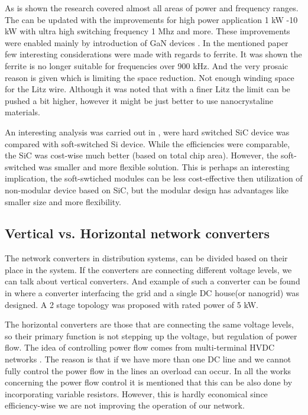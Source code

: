 \documentclass[]{scrartcl}
\begin{document}
As is shown the research covered almost all areas of power and frequency ranges. The \cite{Shen2006} can be updated with the improvements for high power application 1 kW -10 kW with ultra high switching frequency 1 Mhz and more. These improvements were enabled mainly by introduction of GaN devices \cite{Mu2014}. In the mentioned paper \cite{Mu2014} few interesting considerations were made  with regards to ferrite. It was shown the ferrite is no longer suitable for  frequencies over 900 kHz. And the very prosaic reason is given which is limiting the space reduction. Not enough winding space for  the Litz wire. Although it was noted that with a finer Litz the limit can be pushed a bit higher, however it might be just better to use nanocrystaline materials. 


An interesting analysis was carried out in \cite{Waffler2009}, were hard switched SiC device was compared with soft-switched Si device. While the efficiencies were comparable, the SiC was cost-wise much better (based on total chip area). However, the soft-switched was smaller and more flexible solution. This is perhaps an interesting implication, the soft-swtiched modules can be less cost-effective then utilization of non-modular device based on SiC, but the modular design has advantages like smaller size and more flexibility.

\subsection{Vertical vs. Horizontal network converters}

The network converters in distribution systems, can be divided based on their place in the system. If the converters are connecting different voltage levels, we can talk about vertical converters. And example of such a converter can be found in \cite{Dong2013} where a converter interfacing the grid and a single DC house(or nanogrid) was designed. A 2 stage topology was proposed with rated power of 5 kW. 



The horizontal converters are those that are connecting the same voltage levels, so their primary function is not stepping up the voltage, but regulation of power flow. The idea of controlling power flow comes from multi-terminal HVDC networks \cite{Hajian2012}. The reason is that if we have more than one DC line and we cannot fully control the power flow in the lines an overload can occur. In all the works concerning the power flow control it is mentioned that this can be also done by incorporating variable resistors. However, this is hardly economical since efficiency-wise we are not improving the operation of our network. 
\end{document}
